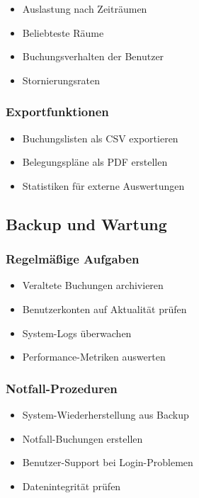 \begin{itemize}
    \item Auslastung nach Zeiträumen
    \item Beliebteste Räume
    \item Buchungsverhalten der Benutzer
    \item Stornierungsraten
\end{itemize}

\subsubsection{Exportfunktionen}

\begin{itemize}
    \item Buchungslisten als CSV exportieren
    \item Belegungspläne als PDF erstellen
    \item Statistiken für externe Auswertungen
\end{itemize}

\subsection{Backup und Wartung}

\subsubsection{Regelmäßige Aufgaben}

\begin{itemize}
    \item Veraltete Buchungen archivieren
    \item Benutzerkonten auf Aktualität prüfen
    \item System-Logs überwachen
    \item Performance-Metriken auswerten
\end{itemize}

\subsubsection{Notfall-Prozeduren}

\begin{itemize}
    \item System-Wiederherstellung aus Backup
    \item Notfall-Buchungen erstellen
    \item Benutzer-Support bei Login-Problemen
    \item Datenintegrität prüfen
\end{itemize}

\newpage